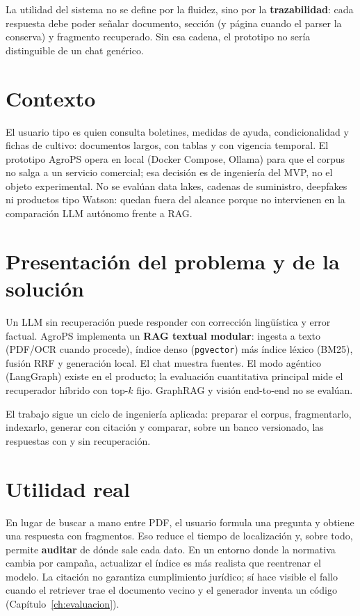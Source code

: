 La utilidad del sistema no se define por la fluidez, sino por la \textbf{trazabilidad}: cada respuesta debe poder señalar documento, sección (y página cuando el parser la conserva) y fragmento recuperado. Sin esa cadena, el prototipo no sería distinguible de un chat genérico.

\section{Contexto}

El usuario tipo es quien consulta boletines, medidas de ayuda, condicionalidad y fichas de cultivo: documentos largos, con tablas y con vigencia temporal. El prototipo AgroPS opera en local (Docker Compose, Ollama) para que el corpus no salga a un servicio comercial; esa decisión es de ingeniería del MVP, no el objeto experimental. No se evalúan data lakes, cadenas de suministro, deepfakes ni productos tipo Watson: quedan fuera del alcance porque no intervienen en la comparación LLM autónomo frente a RAG.

\section{Presentación del problema y de la solución}

Un LLM sin recuperación puede responder con corrección lingüística y error factual. AgroPS implementa un \textbf{RAG textual modular}: ingesta a texto (PDF/OCR cuando procede), índice denso (\texttt{pgvector}) más índice léxico (BM25), fusión RRF y generación local. El chat muestra fuentes. El modo agéntico (LangGraph) existe en el producto; la evaluación cuantitativa principal mide el recuperador híbrido con top-$k$ fijo. GraphRAG y visión end-to-end no se evalúan.

El trabajo sigue un ciclo de ingeniería aplicada: preparar el corpus, fragmentarlo, indexarlo, generar con citación y comparar, sobre un banco versionado, las respuestas con y sin recuperación.

\section{Utilidad real}

En lugar de buscar a mano entre PDF, el usuario formula una pregunta y obtiene una respuesta con fragmentos. Eso reduce el tiempo de localización y, sobre todo, permite \textbf{auditar} de dónde sale cada dato. En un entorno donde la normativa cambia por campaña, actualizar el índice es más realista que reentrenar el modelo. La citación no garantiza cumplimiento jurídico; sí hace visible el fallo cuando el retriever trae el documento vecino y el generador inventa un código (Capítulo~\ref{ch:evaluacion}).

